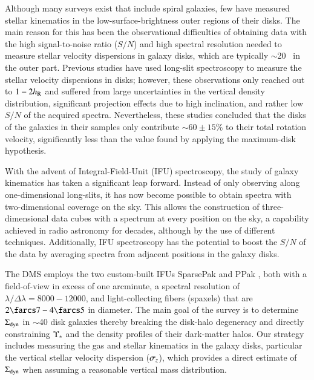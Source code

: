 \documentclass[traditabstract]{aa} %
\begin{document}
Although many surveys exist that include spiral galaxies, few have measured
stellar kinematics in the low-surface-brightness outer regions of their disks.
The main reason for this has been the observational difficulties of obtaining
data with the high signal-to-noise ratio ($S/N$) and high spectral resolution
needed to measure stellar velocity dispersions in galaxy disks, which are
typically $\sim$20 \kms\ in the outer part.  Previous studies
\citep[e.g.,][]{kruit1986, bottema1993, kregel2005} have used long-slit
spectroscopy to measure the stellar velocity dispersions in disks; however,
these observations only reached out to $1-2h_{\rm R}$ and suffered from large uncertainties
in the vertical density distribution, significant projection effects
due to high inclination, and rather low $S/N$ of the acquired spectra.
Nevertheless, these studies concluded that the disks of the galaxies in their
samples only contribute $\sim60\pm15$\% to their total rotation velocity, significantly
less than the value found by applying the maximum-disk hypothesis.

With the advent of Integral-Field-Unit (IFU) spectroscopy, the study of galaxy
kinematics has taken a significant leap forward.  Instead of only observing along
one-dimensional long-slits, it has now become possible to obtain spectra with
two-dimensional coverage on the sky.  This allows the construction of three-dimensional
data cubes with a spectrum at every position on the sky, a capability achieved in
radio astronomy for decades, although by the use of different techniques. Additionally,
IFU spectroscopy has the potential to boost the $S/N$ of the data by averaging spectra
from adjacent positions in the galaxy disks.

The DMS employs the two custom-built IFUs SparsePak \citep{bershady2004,bershady2005}
and PPak \citep{verheyen2004,kelz2006}, both with a field-of-view in excess of one
arcminute, a spectral resolution of $\lambda/\Delta\lambda=8000-12000$, and
light-collecting fibers (spaxels) that are $2\farcs7-4\farcs5$ in diameter.
The main goal of the survey is to determine $\Sigma_{\rm dyn}$ in $\sim$40 disk galaxies
thereby breaking the disk-halo degeneracy and directly constraining $\Upsilon_\ast$ and the
density profiles of their dark-matter halos.  Our strategy includes measuring the gas
and stellar kinematics in the galaxy disks, particular the vertical stellar velocity
dispersion ($\sigma_z$), which provides a direct estimate of $\Sigma_{\rm dyn}$
 when assuming a reasonable vertical mass distribution.
\end{document}
